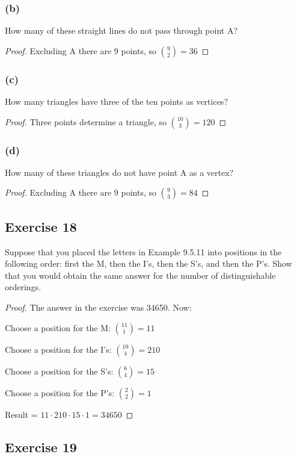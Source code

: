 \documentclass[14pt]{extarticle}
\begin{document}
\subsubsection{(b)}
How many of these straight lines do not pass through point A?

\begin{proof}
Excluding A there are 9 points, so \(\binom{9}{2} = 36\)
\end{proof}

\subsubsection{(c)}
How many triangles have three of the ten points as vertices?

\begin{proof}
Three points determine a triangle, so \(\binom{10}{3} = 120\)
\end{proof}

\subsubsection{(d)}
How many of these triangles do not have point A as a vertex?

\begin{proof}
Excluding A there are 9 points, so \(\binom{9}{3} = 84\)
\end{proof}

\subsection{Exercise 18}
Suppose that you placed the letters in Example 9.5.11 into positions in the following order: first the M, then the 
I’s, then the S’s, and then the P’s. Show that you would obtain the same answer for the number of distinguishable 
orderings.

\begin{proof}
The answer in the exercise was 34650. Now:

Choose a position for the M: \(\binom{11}{1} = 11\)

Choose a position for the I's: \(\binom{10}{4} = 210\)

Choose a position for the S's: \(\binom{6}{4} = 15\)

Choose a position for the P's: \(\binom{2}{2} = 1\)

Result = \(11 \cdot 210 \cdot 15 \cdot 1 = 34650\)
\end{proof}

\subsection{Exercise 19}
\end{document}
